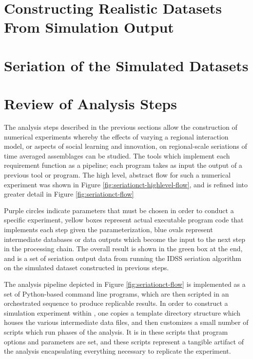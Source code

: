 \section{Constructing Realistic Datasets From Simulation Output}


\section{Seriation of the Simulated Datasets}


\section{Review of \seriationct Analysis Steps}

The analysis steps described in the previous sections allow the construction of numerical experiments whereby the effects of varying a regional interaction model, or aspects of social learning and innovation, on regional-scale seriations of time averaged assemblages can be studied.  The tools which implement each requirement function as a pipeline; each program takes as input the output of a previous tool or program.  The high level, abstract flow for such a numerical experiment was shown in Figure \ref{fig:seriationct-highlevel-flow}, and is refined into greater detail in Figure \ref{fig:seriationct-flow}

Purple circles indicate parameters that must be chosen in order to conduct a specific experiment, yellow boxes represent actual executable program code that implements each step given the parameterization, blue ovals represent intermediate databases or data outputs which become the input to the next step in the processing chain.  The overall result is shown in the green box at the end, and is a set of seriation output data from running the IDSS seriation algorithm on the simulated dataset constructed in previous steps.  



The analysis pipeline depicted in Figure \ref{fig:seriationct-flow} is implemented as a set of Python-based command line programs, which are then scripted in an orchestrated sequence to produce replicable results.  In order to construct a simulation experiment within \seriationct, one copies a template directory structure which houses the various intermediate data files, and then customizes a small number of scripts which run phases of the analysis.  It is in these scripts that program options and parameters are set, and these scripts represent a tangible artifact of the analysis encapsulating everything necessary to replicate the experiment.  









